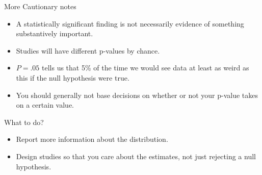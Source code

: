 \documentclass{beamer}
\numberwithin{equation}{section}
\begin{document}
\begin{frame}{More Cautionary notes}
\begin{itemize}
\item  A statistically significant finding is not necessarily evidence of something substantively important.\pause
\item Studies will have different p-values by chance.  \pause
\item $P=.05$ tells us that 5\% of the time we would see data \alert{at least} as weird as this if the null hypothesis were true.\pause
\item You should generally not base decisions on whether or not your p-value takes on a certain value.
\end{itemize}
\end{frame}

\begin{frame}{What to do?}
\begin{itemize}
\item Report more information about the distribution.
\item Design studies so that you care about the estimates, not just rejecting a null hypothesis.
\end{itemize}
\end{frame}
\end{document}

